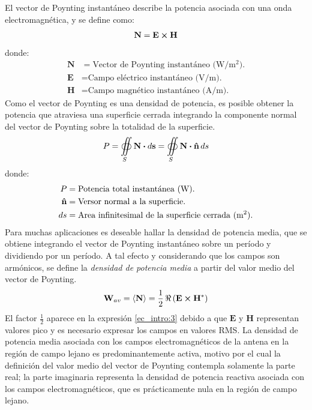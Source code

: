 El vector de Poynting instantáneo describe la potencia asociada con una onda electromagnética, y se define como:
\begin{align}
\mathbf{N} = \mathbf{E}\boldsymbol{\times}\mathbf{H}
\label{ec_intro:1}
\end{align}
donde:
\begin{align*}
\mathbf{N} &= \text{Vector de Poynting instantáneo (W/m$^2$).}\\
\mathbf{E} &= \text{Campo eléctrico instantáneo (V/m).}\\
\mathbf{H} &= \text{Campo magnético instantáneo (A/m).}
\end{align*}
Como el vector de Poynting es una densidad de potencia, es posible obtener la potencia que atraviesa una superficie cerrada integrando la componente normal del vector de Poynting sobre la totalidad de la superficie.
\begin{align}
P = \oiint\limits_{S}\mathbf{N}\boldsymbol{\cdot} d\mathbf{s} = \oiint\limits_{S}\mathbf{N}\boldsymbol{\cdot}\bm{\mathbf{\hat{n}}}\,ds
\label{ec_intro:2}
\end{align}
donde:
\begin{align*}
P &= \text{Potencia total instantánea (W).}\\
\bm{\mathbf{\hat{n}}} &= \text{Versor normal a la superficie.}\\
ds &= \text{Area infinitesimal de la superficie cerrada (m$^2$).}
\end{align*}
Para muchas aplicaciones es deseable hallar la densidad de potencia media, que se obtiene integrando el vector de Poynting instantáneo sobre un período y dividiendo por un período. A tal efecto y considerando que los campos son armónicos, se define la \emph{densidad de potencia media} a partir del valor medio del vector de Poynting.
\begin{align}
\mathbf{W}_{av} = \left<\mathbf{N}\right> = \frac{1}{2}\,\Re\left(\mathbf{E}\boldsymbol{\times}\mathbf{H}^*\right)
\label{ec_intro:3}
\end{align}
El factor $\frac{1}{2}$ aparece en la expresión \eqref{ec_intro:3} debido a que $\mathbf{E}$ y $\mathbf{H}$ representan valores pico y es necesario expresar los campos en valores RMS. La densidad de potencia media asociada con los campos electromagnéticos de la antena en la región de campo lejano es predominantemente activa, motivo por el cual la definición del valor medio del vector de Poynting contempla solamente la parte real; la parte imaginaria representa la densidad de potencia reactiva asociada con los campos electromagnéticos, que es prácticamente nula en la región de campo lejano.

